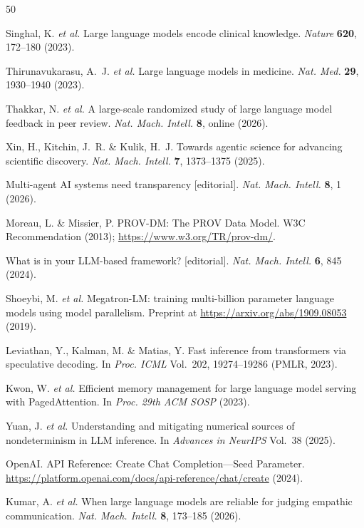 \documentclass[sn-nature]{sn-jnl}
\begin{document}
\begin{thebibliography}{50}

Singhal, K. \emph{et al.}
Large language models encode clinical knowledge.
\emph{Nature} \textbf{620}, 172--180 (2023).

Thirunavukarasu, A.~J. \emph{et al.}
Large language models in medicine.
\emph{Nat. Med.} \textbf{29}, 1930--1940 (2023).

Thakkar, N. \emph{et al.}
A large-scale randomized study of large language model feedback in peer review.
\emph{Nat. Mach. Intell.} \textbf{8}, online (2026).

Xin, H., Kitchin, J.~R. \& Kulik, H.~J.
Towards agentic science for advancing scientific discovery.
\emph{Nat. Mach. Intell.} \textbf{7}, 1373--1375 (2025).

Multi-agent AI systems need transparency [editorial].
\emph{Nat. Mach. Intell.} \textbf{8}, 1 (2026).

Moreau, L. \& Missier, P.
PROV-DM: The PROV Data Model.
W3C Recommendation (2013); \url{https://www.w3.org/TR/prov-dm/}.

What is in your LLM-based framework? [editorial].
\emph{Nat. Mach. Intell.} \textbf{6}, 845 (2024).

Shoeybi, M. \emph{et al.}
Megatron-LM: training multi-billion parameter language models using model parallelism.
Preprint at \url{https://arxiv.org/abs/1909.08053} (2019).

Leviathan, Y., Kalman, M. \& Matias, Y.
Fast inference from transformers via speculative decoding.
In \emph{Proc. ICML} Vol.~202, 19274--19286 (PMLR, 2023).

Kwon, W. \emph{et al.}
Efficient memory management for large language model serving with PagedAttention.
In \emph{Proc. 29th ACM SOSP} (2023).

Yuan, J. \emph{et al.}
Understanding and mitigating numerical sources of nondeterminism in LLM inference.
In \emph{Advances in NeurIPS} Vol.~38 (2025).

OpenAI. API Reference: Create Chat Completion---Seed Parameter.
\url{https://platform.openai.com/docs/api-reference/chat/create} (2024).

Kumar, A. \emph{et al.}
When large language models are reliable for judging empathic communication.
\emph{Nat. Mach. Intell.} \textbf{8}, 173--185 (2026).


\end{thebibliography}
\end{document}
